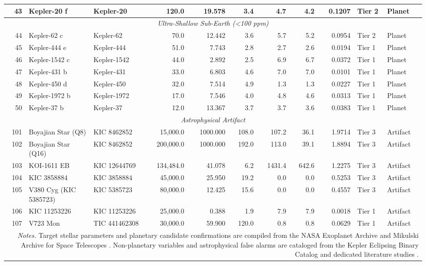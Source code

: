 {\begin{longtable}{r l l r r r r r r l l}
43 & Kepler-20 f      & Kepler-20    &     120.0 &  19.578 &   3.4 &    4.7 &    4.2 &  0.1207 & Tier 2  & Planet \\
\hline
\multicolumn{11}{c}{\textit{Ultra-Shallow Sub-Earth (<100 ppm)}} \\
\hline
44 & Kepler-62 c      & Kepler-62    &      70.0 &  12.442 &   3.6 &    5.7 &    5.2 &  0.0954 & Tier 2  & Planet \\
45 & Kepler-444 e     & Kepler-444   &      51.0 &   7.743 &   2.8 &    2.7 &    2.6 &  0.0194 & Tier 1  & Planet \\
46 & Kepler-1542 c    & Kepler-1542  &      44.0 &   2.892 &   2.5 &    6.9 &    6.7 &  0.0372 & Tier 1  & Planet \\
47 & Kepler-431 b     & Kepler-431   &      33.0 &   6.803 &   4.6 &    7.0 &    7.0 &  0.0101 & Tier 1  & Planet \\
48 & Kepler-450 d     & Kepler-450   &      32.0 &   7.514 &   4.9 &    1.3 &    1.3 &  0.0227 & Tier 1  & Planet \\
49 & Kepler-1972 b    & Kepler-1972  &      17.0 &   7.546 &   4.0 &    4.8 &    4.6 &  0.0313 & Tier 1  & Planet \\
50 & Kepler-37 b      & Kepler-37    &      12.0 &  13.367 &   3.7 &    3.7 &    3.6 &  0.0383 & Tier 1  & Planet \\
\hline
\multicolumn{11}{c}{\textit{Astrophysical Artifact}} \\
\hline
101 & Boyajian Star (Q8) & KIC 8462852  &  15,000.0 & 1000.000 & 108.0 &  107.2 &   36.1 &  1.9714 & Tier 3  & Artifact \\
102 & Boyajian Star (Q16) & KIC 8462852  & 200,000.0 & 1000.000 & 192.0 &  113.0 &   39.1 &  1.8894 & Tier 3  & Artifact \\
103 & KOI-1611 EB      & KIC 12644769 & 134,484.0 &  41.078 &   6.2 & 1431.4 &  642.6 &  1.2275 & Tier 3  & Artifact \\
104 & KIC 3858884      & KIC 3858884  &  45,000.0 &  25.950 &  19.2 &    0.0 &    0.0 &  0.5253 & Tier 3  & Artifact \\
105 & V380 Cyg (KIC 5385723) & KIC 5385723  &  80,000.0 &  12.425 &  15.6 &    0.0 &    0.0 &  0.4557 & Tier 3  & Artifact \\
106 & KIC 11253226     & KIC 11253226 &  25,000.0 &   0.388 &   1.9 &    7.9 &    7.9 &  0.0018 & Tier 1  & Artifact \\
107 & V723 Mon         & TIC 441462308 &  30,000.0 &  59.900 & 120.0 &    0.8 &    0.8 &  0.0629 & Tier 1  & Artifact \\
\hline\hline
\multicolumn{11}{p{0.95\textwidth}}{\textit{Notes.} Target stellar parameters and planetary candidate confirmations are compiled from the NASA Exoplanet Archive \citep{akeson2013} and Mikulski Archive for Space Telescopes \citep{borucki2010}. Non-planetary variables and astrophysical false alarms are cataloged from the Kepler Eclipsing Binary Catalog \citep{prsa2011,armstrong2014} and dedicated literature studies \citep{boyajian2016}.}\\
\end{longtable}

}
